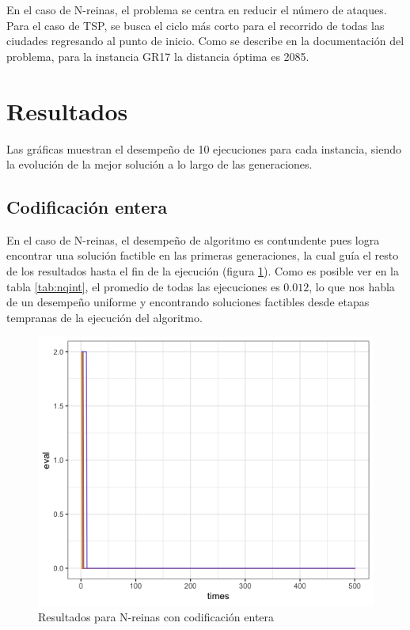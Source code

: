 \documentclass[letterpaper,12pt]{article}
\theoremstyle{definition}
\begin{document}
En el caso de N-reinas, el problema se centra en reducir el número de ataques. Para el caso de TSP, se busca el ciclo más corto para el recorrido de todas las ciudades regresando al punto de inicio. Como se describe en la documentación del problema, para la instancia GR17 la distancia óptima es 2085.

\section{Resultados}

Las gráficas muestran el desempeño de 10 ejecuciones para cada instancia, siendo la evolución de la mejor solución a lo largo de las generaciones.

\subsection{Codificación entera}

En el caso de N-reinas, el desempeño de algoritmo es contundente pues logra encontrar una solución factible en las primeras generaciones, la cual guía el resto de los resultados hasta el fin de la ejecución (figura \ref{fig:nqint}). Como es posible ver en la tabla \ref{tab:nqint}, el promedio de todas las ejecuciones es \(0.012\), lo que nos habla de un desempeño uniforme y encontrando soluciones factibles desde etapas tempranas de la ejecución del algoritmo. \\

\begin{figure}[H]
  
    \includegraphics[width=\linewidth]{int_nq}
    \caption{Resultados para N-reinas con codificación entera}
    \label{fig:nqint}
\end{figure}
\end{document}
